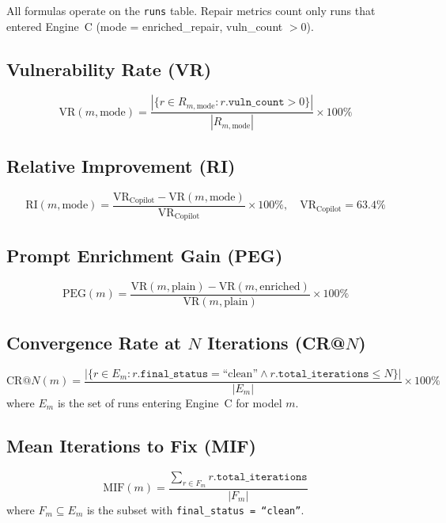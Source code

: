 \documentclass[12pt,a4paper]{report}
\begin{document}
All formulas operate on the \texttt{runs} table. Repair metrics count only runs
that entered Engine~C (mode = enriched\_repair, vuln\_count $> 0$).

\subsection{Vulnerability Rate (VR)}
\begin{equation}
\mathrm{VR}(m,\text{mode}) =
  \frac{|\{r \in R_{m,\text{mode}} : r.\texttt{vuln\_count} > 0\}|}
       {|R_{m,\text{mode}}|} \times 100\%
\label{eq:vr}
\end{equation}

\subsection{Relative Improvement (RI)}
\begin{equation}
\mathrm{RI}(m,\text{mode}) =
  \frac{\mathrm{VR}_\text{Copilot} - \mathrm{VR}(m,\text{mode})}
       {\mathrm{VR}_\text{Copilot}} \times 100\%, \quad
\mathrm{VR}_\text{Copilot} = 63.4\%
\label{eq:ri}
\end{equation}

\subsection{Prompt Enrichment Gain (PEG)}
\begin{equation}
\mathrm{PEG}(m) =
  \frac{\mathrm{VR}(m,\text{plain}) - \mathrm{VR}(m,\text{enriched})}
       {\mathrm{VR}(m,\text{plain})} \times 100\%
\label{eq:peg}
\end{equation}

\subsection{Convergence Rate at $N$ Iterations (CR@$N$)}
\begin{equation}
\mathrm{CR@}N(m) =
  \frac{|\{r \in E_m : r.\texttt{final\_status}=\text{``clean''}
         \wedge r.\texttt{total\_iterations} \leq N\}|}
       {|E_m|} \times 100\%
\label{eq:crn}
\end{equation}
where $E_m$ is the set of runs entering Engine~C for model $m$.

\subsection{Mean Iterations to Fix (MIF)}
\begin{equation}
\mathrm{MIF}(m) =
  \frac{\displaystyle\sum_{r \in F_m} r.\texttt{total\_iterations}}{|F_m|}
\label{eq:mif}
\end{equation}
where $F_m \subseteq E_m$ is the subset with \texttt{final\_status = ``clean''}.
\end{document}
